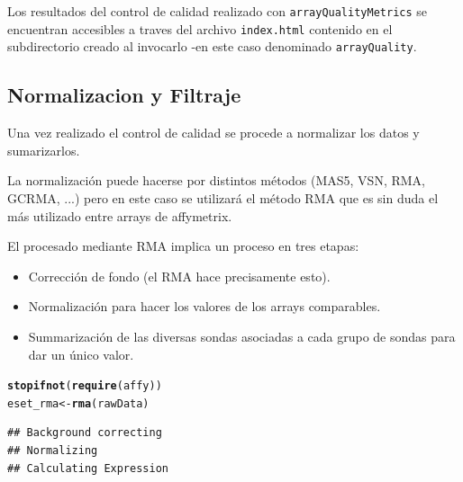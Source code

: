 \documentclass[a4paper]{article}\usepackage[]{graphicx}\usepackage[]{color}
\makeatletter
\newcommand{\hlstd}[1]{\textcolor[rgb]{0.345,0.345,0.345}{#1}}%
\newcommand{\hlkwb}[1]{\textcolor[rgb]{0.69,0.353,0.396}{#1}}%
\newcommand{\hlkwd}[1]{\textcolor[rgb]{0.737,0.353,0.396}{\textbf{#1}}}%
\newenvironment{kframe}{%
 \def\at@end@of@kframe{}%
 \ifinner\ifhmode%
  \def\at@end@of@kframe{\end{minipage}}%
  \begin{minipage}{\columnwidth}%
 \fi\fi%
 \def\FrameCommand##1{\hskip\@totalleftmargin \hskip-\fboxsep
 \colorbox{shadecolor}{##1}\hskip-\fboxsep
     \hskip-\linewidth \hskip-\@totalleftmargin \hskip\columnwidth}%
 \MakeFramed {\advance\hsize-\width
   \@totalleftmargin\z@ \linewidth\hsize
   \@setminipage}}%
 {\par\unskip\endMakeFramed%
 \at@end@of@kframe}
\newenvironment{knitrout}{}{} %
\makeatother
\begin{document}
Los resultados del control de calidad realizado con \texttt{arrayQualityMetrics} se encuentran  accesibles a traves del archivo \texttt{index.html} contenido en el subdirectorio creado al invocarlo -en este caso denominado \texttt{arrayQuality}.


\subsection{Normalizacion y Filtraje}

Una vez realizado el control de calidad se procede a normalizar los datos y sumarizarlos.

La normalización puede hacerse por distintos métodos (MAS5, VSN, RMA, GCRMA, ...) pero en este caso se utilizará el método RMA que es sin duda el más utilizado entre arrays de affymetrix.

El procesado mediante RMA implica un proceso en tres etapas: 
\begin{itemize}
\item Corrección de fondo (el RMA hace precisamente esto).
\item Normalización para hacer los valores de los arrays comparables.
\item Summarización de las diversas sondas asociadas a cada grupo de sondas para dar un único valor.
\end{itemize}


\begin{knitrout}
\color{fgcolor}\begin{kframe}
\begin{alltt}
\hlkwd{stopifnot}\hlstd{(}\hlkwd{require}\hlstd{(affy))}
\hlstd{eset_rma} \hlkwb{<-} \hlkwd{rma}\hlstd{(rawData)}
\end{alltt}
\begin{verbatim}
## Background correcting
## Normalizing
## Calculating Expression
\end{verbatim}
\end{kframe}
\end{knitrout}
\end{document}
